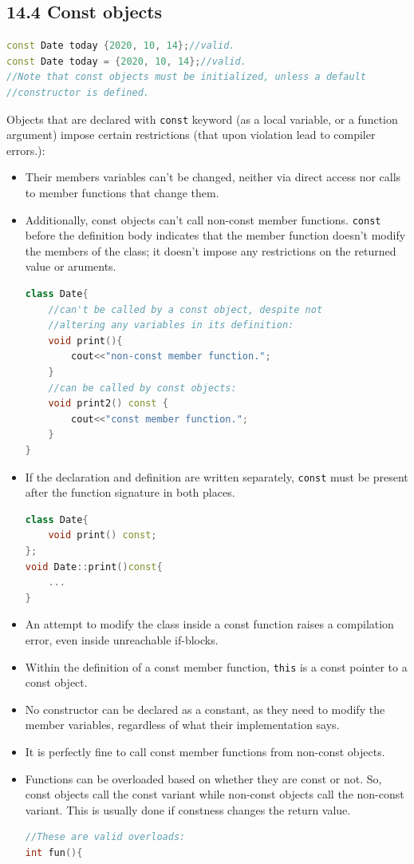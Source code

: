 \documentclass{report}
\begin{document}
\subsection{14.4 Const objects}
\begin{lstlisting}[language=C++]
const Date today {2020, 10, 14};//valid.
const Date today = {2020, 10, 14};//valid.
//Note that const objects must be initialized, unless a default
//constructor is defined.
\end{lstlisting}

Objects that are declared with \texttt{const} keyword (as a local variable, or a function argument) impose certain restrictions (that upon violation lead to compiler errors.):
\begin{itemize}
\item Their members variables can't be changed, neither via direct access nor calls to member functions that change them.
\item Additionally, const objects can't call non-const member functions. \texttt{const} before the definition body indicates that the member function doesn't modify the members of the class; it doesn't impose any restrictions on the returned value or aruments.
\begin{lstlisting}[language=C++]
class Date{
    //can't be called by a const object, despite not
    //altering any variables in its definition:
    void print(){
        cout<<"non-const member function.";
    }
    //can be called by const objects:
    void print2() const {
        cout<<"const member function.";
    }
}
\end{lstlisting}
\item If the declaration and definition are written separately, \texttt{const} must be present after the function signature in both places.
\begin{lstlisting}[language=C++]
class Date{
    void print() const;
};
void Date::print()const{
    ...
}
\end{lstlisting}
\item An attempt to modify the class inside a const function raises a compilation error, even inside unreachable if-blocks.
\item Within the definition of a const member function, \texttt{this} is a const pointer to a const object.
\item No constructor can be declared as a constant, as they need to modify the member variables, regardless of what their implementation says.
\item It is perfectly fine to call const member functions from non-const objects.
\item Functions can be overloaded based on whether they are const or not. So, const objects call the const variant while non-const objects call the non-const variant. This is usually done if constness changes the return value.
\begin{lstlisting}[language=C++]
//These are valid overloads:
int fun(){


\end{lstlisting}
\end{itemize}
\end{document}
